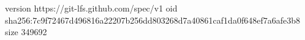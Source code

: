 version https://git-lfs.github.com/spec/v1
oid sha256:7c9f72467d496816a22207b256dd803268d7a40861caf1da0f648ef7a6afe3b8
size 349692
